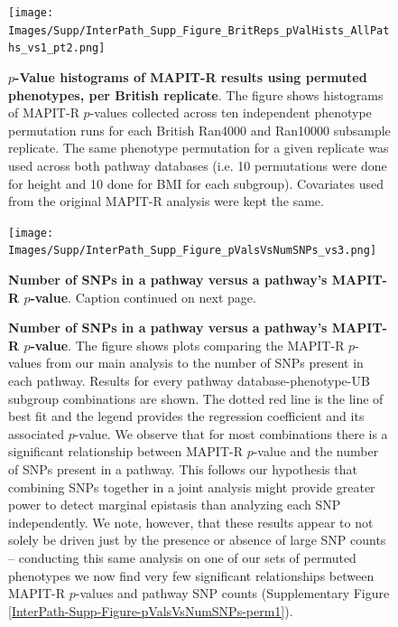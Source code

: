 \setlength{\footskip}{2cm}
\begin{figure}[htbp]
\centering
\vspace*{-1cm}
\texttt{[image: Images/Supp/InterPath\_Supp\_Figure\_BritReps\_pValHists\_AllPaths\_vs1\_pt2.png]}
\caption[TBD]{\textbf{$p$-Value histograms of MAPIT-R results using permuted phenotypes, per British replicate}. The figure shows histograms of MAPIT-R $p$-values collected across ten independent phenotype permutation runs for each British Ran4000 and Ran10000 subsample replicate. The same phenotype permutation for a given replicate was used across both pathway databases (i.e. 10 permutations were done for height and 10 done for BMI for each subgroup). Covariates used from the original MAPIT-R analysis were kept the same.}
\label{InterPath-Supp-Figure-BritReps-10perms-pValHists-pt2}
\end{figure}
\clearpage
\setlength{\footskip}{1cm}

\setlength{\footskip}{3cm}
\begin{figure}[htbp]
\centering
\vspace*{-2cm}
\texttt{[image: Images/Supp/InterPath\_Supp\_Figure\_pValsVsNumSNPs\_vs3.png]}
\caption[TBD]{\textbf{Number of SNPs in a pathway versus a pathway's MAPIT-R $p$-value}. Caption continued on next page.}
\label{InterPath-Supp-Figure-pValsVsNumSNPs}
\end{figure}
\clearpage
\setlength{\footskip}{1cm}

\addtocounter{figure}{-1}
\begin{figure} [t!]
  \caption{\textbf{Number of SNPs in a pathway versus a pathway's MAPIT-R $p$-value}. The figure shows plots comparing the MAPIT-R $p$-values from our main analysis to the number of SNPs present in each pathway. Results for every pathway database-phenotype-UB subgroup combinations are shown. The dotted red line is the line of best fit and the legend provides the regression coefficient and its associated $p$-value. We observe that for most combinations there is a significant relationship between MAPIT-R $p$-value and the number of SNPs present in a pathway. This follows our hypothesis that combining SNPs together in a joint analysis might provide greater power to detect marginal epistasis than analyzing each SNP independently. We note, however, that these results appear to not solely be driven just by the presence or absence of large SNP counts -- conducting this same analysis on one of our sets of permuted phenotypes we now find very few significant relationships between MAPIT-R $p$-values and pathway SNP counts (Supplementary Figure \ref{InterPath-Supp-Figure-pValsVsNumSNPs-perm1}).}
\label{InterPath-Supp-Figure-pValsVsNumSNPs-Caption}
\end{figure}
\clearpage

